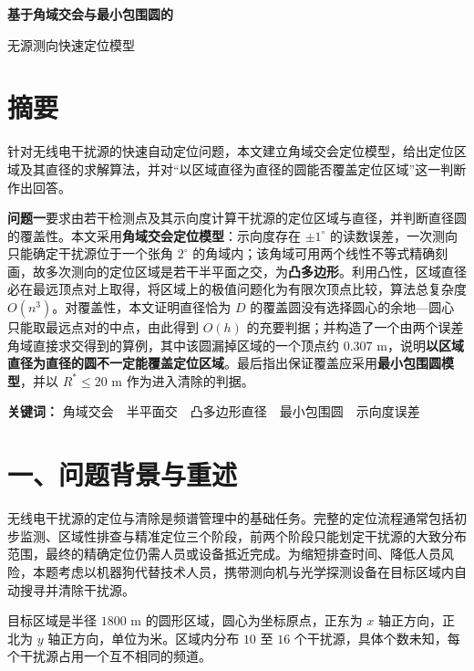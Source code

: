 \documentclass[UTF8,a4paper,zihao=-4,fontset=fandol]{ctexart}
\begin{document}
\thispagestyle{plain}
\begin{center}{\LARGE\bfseries 基于角域交会与最小包围圆的\par\vspace{0.25em}无源测向快速定位模型\par}\end{center}

\section*{摘要}

针对无线电干扰源的快速自动定位问题，本文建立角域交会定位模型，给出定位区域及其直径的求解算法，并对“以区域直径为直径的圆能否覆盖定位区域”这一判断作出回答。

\textbf{问题一}要求由若干检测点及其示向度计算干扰源的定位区域与直径，并判断直径圆的覆盖性。本文采用\textbf{角域交会定位模型}：示向度存在 $\pm1^\circ$ 的读数误差，一次测向只能确定干扰源位于一个张角 $2^\circ$ 的角域内；该角域可用两个线性不等式精确刻画，故多次测向的定位区域是若干半平面之交，为\textbf{凸多边形}。利用凸性，区域直径必在最远顶点对上取得，将区域上的极值问题化为有限次顶点比较，算法总复杂度 $O(n^3)$。对覆盖性，本文证明直径恰为 $D$ 的覆盖圆没有选择圆心的余地---圆心只能取最远点对的中点，由此得到 $O(h)$ 的充要判据；并构造了一个由两个误差角域直接求交得到的算例，其中该圆漏掉区域的一个顶点约 $0.307$ m，说明\textbf{以区域直径为直径的圆不一定能覆盖定位区域}。最后指出保证覆盖应采用\textbf{最小包围圆模型}，并以 $R^*\le20$ m 作为进入清除的判据。

\textbf{关键词：} 角域交会　半平面交　凸多边形直径　最小包围圆　示向度误差

\clearpage
\section*{一、问题背景与重述}

无线电干扰源的定位与清除是频谱管理中的基础任务。完整的定位流程通常包括初步监测、区域性排查与精准定位三个阶段，前两个阶段只能划定干扰源的大致分布范围，最终的精确定位仍需人员或设备抵近完成。为缩短排查时间、降低人员风险，本题考虑以机器狗代替技术人员，携带测向机与光学探测设备在目标区域内自动搜寻并清除干扰源。

目标区域是半径 $1800$ m 的圆形区域，圆心为坐标原点，正东为 $x$ 轴正方向，正北为 $y$ 轴正方向，单位为米。区域内分布 $10$ 至 $16$ 个干扰源，具体个数未知，每个干扰源占用一个互不相同的频道。
\end{document}
